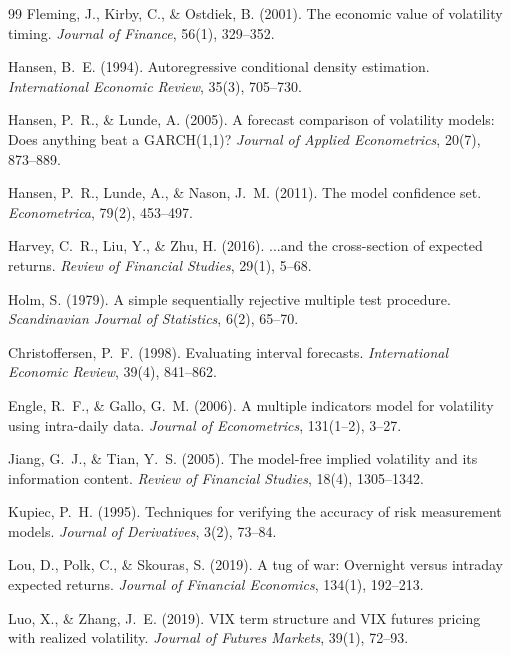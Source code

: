 \documentclass[12pt,a4paper]{article}
\begin{document}
\begin{thebibliography}{99}
Fleming, J., Kirby, C., \& Ostdiek, B. (2001). The economic value of volatility timing. \textit{Journal of Finance}, 56(1), 329--352.

Hansen, B.~E. (1994). Autoregressive conditional density estimation. \textit{International Economic Review}, 35(3), 705--730.

Hansen, P.~R., \& Lunde, A. (2005). A forecast comparison of volatility models: Does anything beat a GARCH(1,1)? \textit{Journal of Applied Econometrics}, 20(7), 873--889.

Hansen, P.~R., Lunde, A., \& Nason, J.~M. (2011). The model confidence set. \textit{Econometrica}, 79(2), 453--497.

Harvey, C.~R., Liu, Y., \& Zhu, H. (2016). ...and the cross-section of expected returns. \textit{Review of Financial Studies}, 29(1), 5--68.

Holm, S. (1979). A simple sequentially rejective multiple test procedure. \textit{Scandinavian Journal of Statistics}, 6(2), 65--70.

Christoffersen, P.~F. (1998). Evaluating interval forecasts. \textit{International Economic Review}, 39(4), 841--862.

Engle, R.~F., \& Gallo, G.~M. (2006). A multiple indicators model for volatility using intra-daily data. \textit{Journal of Econometrics}, 131(1--2), 3--27.

Jiang, G.~J., \& Tian, Y.~S. (2005). The model-free implied volatility and its information content. \textit{Review of Financial Studies}, 18(4), 1305--1342.

Kupiec, P.~H. (1995). Techniques for verifying the accuracy of risk measurement models. \textit{Journal of Derivatives}, 3(2), 73--84.

Lou, D., Polk, C., \& Skouras, S. (2019). A tug of war: Overnight versus intraday expected returns. \textit{Journal of Financial Economics}, 134(1), 192--213.

Luo, X., \& Zhang, J.~E. (2019). VIX term structure and VIX futures pricing with realized volatility. \textit{Journal of Futures Markets}, 39(1), 72--93.


\end{thebibliography}
\end{document}
